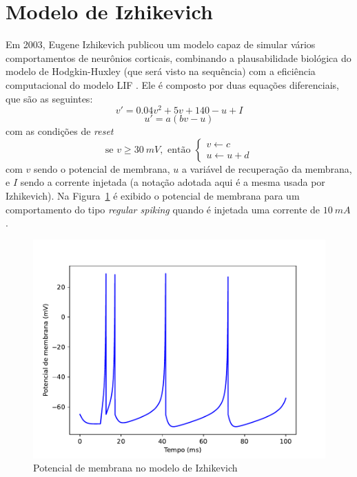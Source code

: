 \section{Modelo de Izhikevich}\label{sec:izhikevich}
Em 2003, Eugene Izhikevich publicou um modelo capaz de simular vários comportamentos de neurônios corticais, combinando a plausabilidade biológica do modelo de Hodgkin-Huxley (que será visto na sequência) com a eficiência computacional do modelo LIF \cite{izhikevich_simple_2003}. Ele é composto por duas equações diferenciais, que são as seguintes:
\begin{equation}\label{eq:izhikevich_v}
	v'=0.04v^2+5v+140-u+I
\end{equation}
\begin{equation}\label{eq:izhikevich_u}
	u'=a(bv-u)
\end{equation}
com as condições de \textit{reset}
\begin{equation}\label{eq:izhikevich_condicao}
	\text{se }v\geq30\ mV,\text{ então }\begin{cases}
		v\leftarrow c\\
		u\leftarrow u+d
	\end{cases}
\end{equation}
com $v$ sendo o potencial de membrana, $u$ a variável de recuperação da membrana, e $I$ sendo a corrente injetada (a notação adotada aqui é a mesma usada por Izhikevich). Na Figura~\ref{fig:izhikevich} é exibido o potencial de membrana para um comportamento do tipo \textit{regular spiking} quando é injetada uma corrente de $10\ mA$.
\begin{figure}[tb]
	\centering
	\caption[Potencial de membrana no modelo de Izhikevich]{Potencial de membrana no modelo de Izhikevich}
	\label{fig:izhikevich}
	\includegraphics[width=0.7\linewidth]{figs/izhikevich}
\end{figure}
